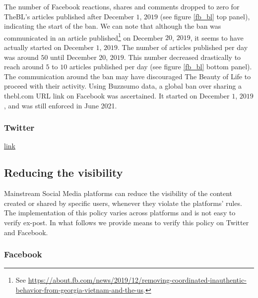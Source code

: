 \documentclass{article}
\begin{document}
The number of Facebook reactions, shares and comments dropped to zero for TheBL’s articles published after December $1$, $2019$ (see figure \ref{fb_bl} top panel), indicating the start of the ban. We can note that although the ban was communicated in an article published\footnote{See \href{https://about.fb.com/news/2019/12/removing-coordinated-inauthentic-behavior-from-georgia-vietnam-and-the-us}{https://about.fb.com/news/2019/12/removing-coordinated-inauthentic-behavior-from-georgia-vietnam-and-the-us}.} on December $20$, $2019$, it seems to have actually started on December $1$, $2019$. The number of articles published per day was around $50$ until December $20$, $2019$. This number decreased drastically to reach around $5$ to $10$ articles published per day (see figure \ref{fb_bl} bottom panel). The communication around the ban may have discouraged The Beauty of Life to proceed with their activity. Using Buzzsumo data, a global ban over sharing a thebl.com URL link on Facebook was ascertained. It started on December $1$, $2019$, and was still enforced in June 2021.

\subsubsection{Twitter}

\href{https://help.twitter.com/en/safety-and-security/phishing-spam-and-malware-links}{link}
\subsection{Reducing the visibility}

Mainstream Social Media platforms can reduce the visibility of the content created or shared by specific users, whenever they violate the platforms' rules. The implementation of this policy varies across platforms and is not easy to verify ex-post. In what follows we provide means to verify this policy on Twitter and Facebook.  

\subsubsection{Facebook}
\end{document}
